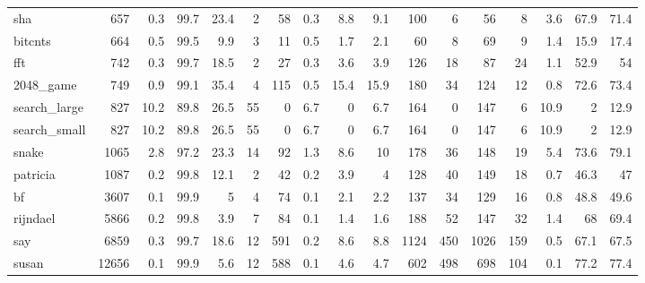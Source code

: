 \begin{tabular}{lrrrrrrrrrrrrrrrr}
 sha             &            657 &    0.3 &        99.7 &   23.4 &     2 &      58 &    0.3 &      8.8 &           9.1 &  100 &         6 &       56 &    8 &    3.6 &     67.9 &          71.4 \\
 bitcnts         &            664 &    0.5 &        99.5 &    9.9 &     3 &      11 &    0.5 &      1.7 &           2.1 &   60 &         8 &       69 &    9 &    1.4 &     15.9 &          17.4 \\
 fft             &            742 &    0.3 &        99.7 &   18.5 &     2 &      27 &    0.3 &      3.6 &           3.9 &  126 &        18 &       87 &   24 &    1.1 &     52.9 &          54   \\
 2048\_game       &            749 &    0.9 &        99.1 &   35.4 &     4 &     115 &    0.5 &     15.4 &          15.9 &  180 &        34 &      124 &   12 &    0.8 &     72.6 &          73.4 \\
 search\_large    &            827 &   10.2 &        89.8 &   26.5 &    55 &       0 &    6.7 &      0   &           6.7 &  164 &         0 &      147 &    6 &   10.9 &      2   &          12.9 \\
 search\_small    &            827 &   10.2 &        89.8 &   26.5 &    55 &       0 &    6.7 &      0   &           6.7 &  164 &         0 &      147 &    6 &   10.9 &      2   &          12.9 \\
 snake           &           1065 &    2.8 &        97.2 &   23.3 &    14 &      92 &    1.3 &      8.6 &          10   &  178 &        36 &      148 &   19 &    5.4 &     73.6 &          79.1 \\
 patricia        &           1087 &    0.2 &        99.8 &   12.1 &     2 &      42 &    0.2 &      3.9 &           4   &  128 &        40 &      149 &   18 &    0.7 &     46.3 &          47   \\
 bf              &           3607 &    0.1 &        99.9 &    5   &     4 &      74 &    0.1 &      2.1 &           2.2 &  137 &        34 &      129 &   16 &    0.8 &     48.8 &          49.6 \\
 rijndael        &           5866 &    0.2 &        99.8 &    3.9 &     7 &      84 &    0.1 &      1.4 &           1.6 &  188 &        52 &      147 &   32 &    1.4 &     68   &          69.4 \\
 say             &           6859 &    0.3 &        99.7 &   18.6 &    12 &     591 &    0.2 &      8.6 &           8.8 & 1124 &       450 &     1026 &  159 &    0.5 &     67.1 &          67.5 \\
 susan           &          12656 &    0.1 &        99.9 &    5.6 &    12 &     588 &    0.1 &      4.6 &           4.7 &  602 &       498 &      698 &  104 &    0.1 &     77.2 &          77.4 \\

\end{tabular}
